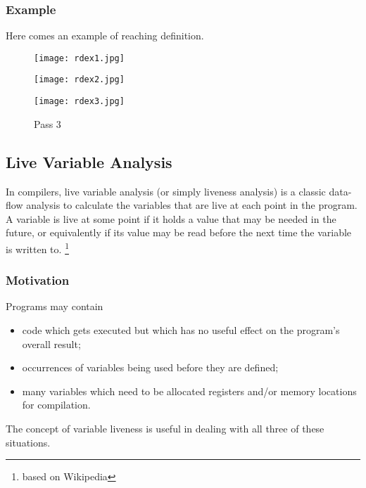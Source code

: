 \subsubsection{Example}
Here comes an example of reaching definition.

\begin{figure}[!htb]
      \texttt{[image: rdex1.jpg]}
      \caption{Pass 1}\label{fig:awesome_image1}
    \endminipage\hfill
      \texttt{[image: rdex2.jpg]}
      \caption{Pass 2}\label{fig:awesome_image2}
    \endminipage\hfill
      \texttt{[image: rdex3.jpg]}
      \caption{Pass 3}\label{fig:awesome_image3}
    \endminipage
\end{figure}



\subsection{ Live    Variable    Analysis   }

In compilers, live variable analysis (or simply liveness analysis)
 is a classic data-flow analysis to calculate the variables that 
 are live at each point in the program. A variable is live at 
 some point if it holds a value that may be needed in the future, 
 or equivalently if its value may be read before the next time 
 the variable is written to. \footnote{based on Wikipedia}

\subsubsection{Motivation}

Programs may contain 

\begin{itemize}
\item code which gets executed but which has no useful
effect on the program's overall result;
\item occurrences of variables being used before they
are defined;
\item many variables which need to be allocated
registers and/or memory locations for compilation.

\end{itemize}

The concept of variable liveness is useful in dealing 
with all three of these situations.



